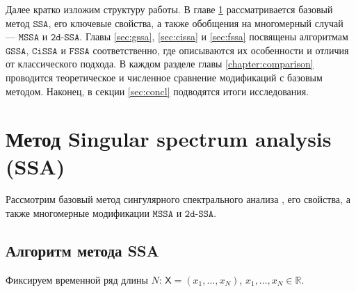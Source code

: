\documentclass[12pt, specialist, subf
]{disser}
\theoremstyle{definition}
\newcommand{\SSA}{\texttt{SSA}}
\newcommand{\GSSA}{\texttt{GSSA}}
\newcommand{\CISSA}{\texttt{CiSSA}}
\newcommand{\MSSA}{\texttt{MSSA}}
\newcommand{\FSSA}{\texttt{FSSA}}
\newcommand{\DSSA}{\texttt{2d-SSA}}
\newcommand{\TS}{\mathsf{X}}
\newtheorem{comment}{Замечание} %
\begin{document}

Далее кратко изложим структуру работы. В главе \ref{sec:ssa} рассматривается базовый метод $\SSA$, его ключевые свойства, а также обобщения на многомерный случай — $\MSSA$ и $\DSSA$.  
Главы \ref{sec:gssa}, \ref{sec:cissa} и \ref{sec:fssa} посвящены алгоритмам $\GSSA$, $\CISSA$ и $\FSSA$ соответственно, где описываются их особенности и отличия от классического подхода.  
В каждом разделе главы \ref{chapter:comparison} проводится теоретическое и численное сравнение модификаций с базовым методом.  
Наконец, в секции \ref{sec:concl} подводятся итоги исследования.



\newpage

\chapter{Метод Singular spectrum analysis (SSA)}
\label{sec:ssa}


Рассмотрим базовый метод сингулярного спектрального анализа \cite{golyandina2001analysis}, его свойства, а также многомерные модификации $\MSSA$ и $\DSSA$.

\section{Алгоритм метода SSA}

Фиксируем временной ряд длины $N$: $\TS = (x_1, \dots, x_{N})$, $x_1, \dots, x_{N} \in \mathbb{R}$.
\end{document}
